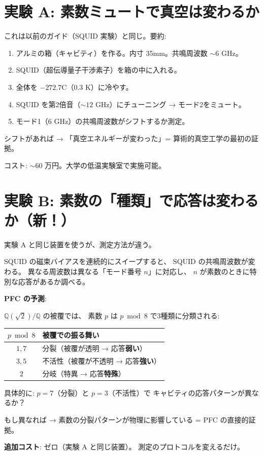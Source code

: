 \documentclass[12pt,a4paper]{article}
\begin{document}
\section{実験 A: 素数ミュートで真空は変わるか}

これは以前のガイド（SQUID 実験）と同じ。要約:

\begin{expbox}[実験 A のセットアップ]
\begin{enumerate}
\item アルミの箱（キャビティ）を作る。内寸 35mm。共鳴周波数 $\sim 6$ GHz。
\item SQUID（超伝導量子干渉素子）を箱の中に入れる。
\item 全体を $-272.7$\textdegree C（0.3 K）に冷やす。
\item SQUID を第2倍音（$\sim 12$ GHz）にチューニング → モード2をミュート。
\item モード1（6 GHz）の共鳴周波数がシフトするか測定。
\end{enumerate}

シフトがあれば → 「真空エネルギーが変わった」= 算術的真空工学の最初の証拠。

コスト: $\sim 60$ 万円。大学の低温実験室で実施可能。
\end{expbox}

\section{実験 B: 素数の「種類」で応答は変わるか（新！）}

\begin{expbox}
実験 A と同じ装置を使うが、測定方法が違う。

SQUID の磁束バイアスを連続的にスイープすると、
SQUID の共鳴周波数が変わる。
異なる周波数は異なる「モード番号 $n$」に対応し、
$n$ が素数のときに特別な応答があるか調べる。

\textbf{PFC の予測}:

$\mathbb{Q}(\sqrt{2})/\mathbb{Q}$ の被覆では、
素数 $p$ は $p \bmod 8$ で3種類に分類される:

\begin{center}
\renewcommand{\arraystretch}{1.3}
\begin{tabular}{cl}
\toprule
$p \bmod 8$ & 被覆での振る舞い \\
\midrule
$1, 7$ & 分裂（被覆が透明 → 応答\textbf{弱い}） \\
$3, 5$ & 不活性（被覆が不透明 → 応答\textbf{強い}） \\
$2$ & 分岐（特異 → 応答\textbf{特殊}） \\
\bottomrule
\end{tabular}
\end{center}

具体的に: $p=7$（分裂）と $p=3$（不活性）で
キャビティの応答パターンが異なるか？

もし異なれば → 素数の分裂パターンが物理に影響している
= PFC の直接的証拠。

\textbf{追加コスト}: ゼロ（実験 A と同じ装置）。
測定のプロトコルを変えるだけ。
\end{expbox}
\end{document}
